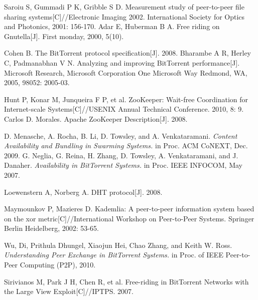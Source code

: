 \documentclass[conference]{IEEEtran}
\begin{document}
	\begin{thebibliography}{10}
		
		Saroiu S, Gummadi P K, Gribble S D. Measurement study of peer-to-peer file sharing systems[C]//Electronic Imaging 2002. International Society for Optics and Photonics, 2001: 156-170.
		Adar E, Huberman B A. Free riding on Gnutella[J]. First monday, 2000, 5(10).

		Cohen B. The BitTorrent protocol specification[J]. 2008.
		Bharambe A R, Herley C, Padmanabhan V N. Analyzing and improving BitTorrent performance[J]. Microsoft Research, Microsoft Corporation One Microsoft Way Redmond, WA, 2005, 98052: 2005-03.
		
		Hunt P, Konar M, Junqueira F P, et al. ZooKeeper: Wait-free Coordination for Internet-scale Systems[C]//USENIX Annual Technical Conference. 2010, 8: 9.
		Carlos D. Morales. Apache ZooKeeper Description[J]. 2008.

		D. Menasche, A. Rocha, B. Li, D. Towsley, and A. Venkataramani.  \emph{Content Availability and Bundling in Swarming Systems.} in Proc. ACM CoNEXT, Dec. 2009.
		G. Neglia, G. Reina, H. Zhang, D. Towsley, A. Venkataramani, and J. Danaher. \emph{Availability in BitTorrent Systems.} in Proc. IEEE INFOCOM, May 2007.
		
		Loewenstern A, Norberg A. DHT protocol[J]. 2008.
		
		Maymounkov P, Mazieres D. Kademlia: A peer-to-peer information system based on the xor metric[C]//International Workshop on Peer-to-Peer Systems. Springer Berlin Heidelberg, 2002: 53-65.
		
		Wu, Di, Prithula Dhungel, Xiaojun Hei, Chao Zhang, and Keith W. Ross. \emph{Understanding Peer Exchange in BitTorrent Systems.} in Proc. of IEEE Peer-to-Peer Computing (P2P), 2010.
		
		Sirivianos M, Park J H, Chen R, et al. Free-riding in BitTorrent Networks with the Large View Exploit[C]//IPTPS. 2007.

		
		
		
		
	\end{thebibliography}
	
	
	
\end{document}
